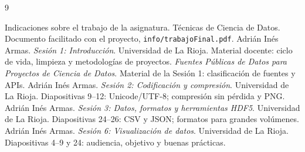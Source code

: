 \documentclass[12pt,openany]{report}
\begin{document}
\raggedbottom
\hypersetup{pageanchor=false}

\hypersetup{pageanchor=true}

\tableofcontents    %


\newpage

\setcounter{page}{1}









\begin{thebibliography}{9}
 Indicaciones sobre el trabajo de la asignatura. Técnicas de Ciencia de Datos. Documento facilitado con el proyecto, \texttt{info/trabajoFinal.pdf}.
 Adrián Inés Armas. \emph{Sesión 1: Introducción}. Universidad de La Rioja. Material docente: ciclo de vida, limpieza y metodologías de proyectos.
 \emph{Fuentes Públicas de Datos para Proyectos de Ciencia de Datos}. Material de la Sesión 1: clasificación de fuentes y APIs.
 Adrián Inés Armas. \emph{Sesión 2: Codificación y compresión}. Universidad de La Rioja. Diapositivas 9--12: Unicode/UTF-8; compresión sin pérdida y PNG.
 Adrián Inés Armas. \emph{Sesión 3: Datos, formatos y herramientas HDF5}. Universidad de La Rioja. Diapositivas 24--26: CSV y JSON; formatos para grandes volúmenes.
 Adrián Inés Armas. \emph{Sesión 6: Visualización de datos}. Universidad de La Rioja. Diapositivas 4--9 y 24: audiencia, objetivo y buenas prácticas.
\end{thebibliography}
\end{document}
